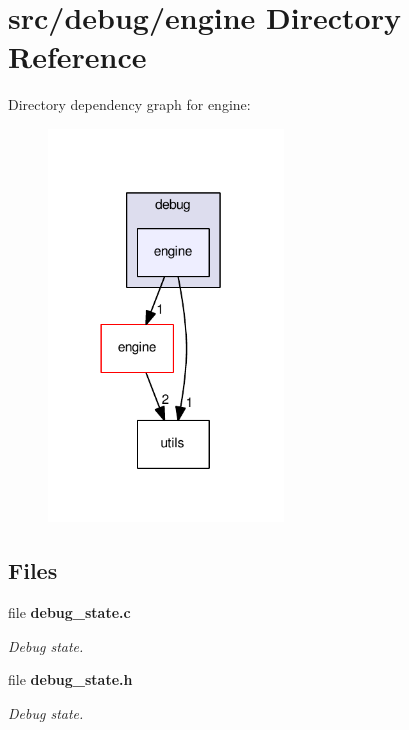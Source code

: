 \section{src/debug/engine Directory Reference}
\label{dir_1c904f016667fbd0231935dbbeb7db4e}
Directory dependency graph for engine\+:
\nopagebreak
\begin{figure}[H]
\begin{center}
\leavevmode
\includegraphics[width=177pt]{dir_1c904f016667fbd0231935dbbeb7db4e_dep}
\end{center}
\end{figure}
\subsection*{Files}
\begin{DoxyCompactItemize}
\item 
file \textbf{ debug\+\_\+state.\+c}
\begin{DoxyCompactList}\small\item\em Debug state. \end{DoxyCompactList}\item 
file \textbf{ debug\+\_\+state.\+h}
\begin{DoxyCompactList}\small\item\em Debug state. \end{DoxyCompactList}\end{DoxyCompactItemize}
